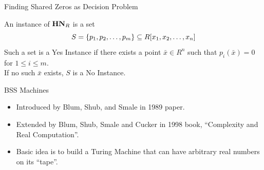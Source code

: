 \documentclass[c]{beamer}
\begin{document}
    
    
  


\begin{frame}{Finding Shared Zeros as Decision Problem}

  An instance of $\mathbf{HN}_R$ is a set 
  $$S = \{p_1, p_2, \ldots, p_m\} \subseteq R[x_1, x_2,\ldots,x_n]$$ 
  Such a set is a Yes Instance if there exists a point $\bar{x} \in
  R^n$ such that $p_i(\bar{x}) = 0$ for $1 \leq i \leq m$.\\
  
  If no such $\bar{x}$ exists, $S$ is a No Instance.
  
\end{frame}

\begin{frame}{BSS Machines}

  \begin{itemize}
  \item[] Introduced by Blum, Shub, and Smale in 1989 paper.

    \vspace{\baselineskip}

  \item[] Extended by Blum, Shub, Smale and Cucker in 1998 book,
    ``Complexity and Real Computation''.

    \vspace{\baselineskip}

  \item[] Basic idea is to build a Turing Machine that can have
    arbitrary real numbers on its ``tape''.
  \end{itemize}
\end{frame}
\end{document}
